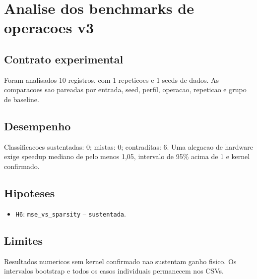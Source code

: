 \chapter{Analise dos benchmarks de operacoes v3}
\section{Contrato experimental}
Foram analisados 10 registros, com 1 repeticoes e 1 seeds de dados.
As comparacoes sao pareadas por entrada, seed, perfil, operacao, repeticao e grupo de baseline.
\section{Desempenho}
Classificacoes sustentadas: 0; mistas: 0; contraditas: 6.
Uma alegacao de hardware exige speedup mediano de pelo menos 1,05, intervalo de 95\% acima de 1 e kernel confirmado.
\section{Hipoteses}
\begin{itemize}
\item \texttt{H6}: \texttt{mse\_vs\_sparsity} -- \texttt{sustentada}.
\end{itemize}
\section{Limites}
Resultados numericos sem kernel confirmado nao sustentam ganho fisico. Os intervalos bootstrap e todos os casos individuais permanecem nos CSVs.
